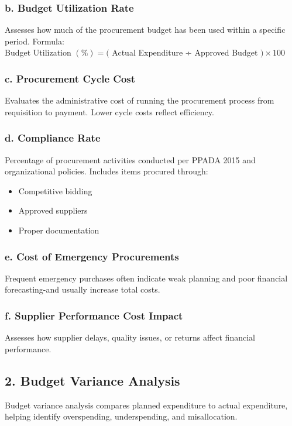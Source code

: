 \documentclass[10pt]{article}
\begin{document}
\subsubsection*{b. Budget Utilization Rate}
Assesses how much of the procurement budget has been used within a specific period. Formula:\\
Budget Utilization $(\%)=($ Actual Expenditure ÷ Approved Budget $) \times 100$

\subsubsection*{c. Procurement Cycle Cost}
Evaluates the administrative cost of running the procurement process from requisition to payment. Lower cycle costs reflect efficiency.

\subsubsection*{d. Compliance Rate}
Percentage of procurement activities conducted per PPADA 2015 and organizational policies. Includes items procured through:

\begin{itemize}
  \item Competitive bidding
  \item Approved suppliers
  \item Proper documentation
\end{itemize}

\subsubsection*{e. Cost of Emergency Procurements}
Frequent emergency purchases often indicate weak planning and poor financial forecasting-and usually increase total costs.

\subsubsection*{f. Supplier Performance Cost Impact}
Assesses how supplier delays, quality issues, or returns affect financial performance.

\subsection*{2. Budget Variance Analysis}
Budget variance analysis compares planned expenditure to actual expenditure, helping identify overspending, underspending, and misallocation.
\end{document}

